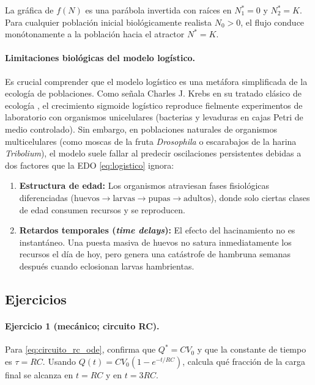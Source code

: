 La gráfica de $f(N)$ es una parábola invertida con raíces en $N_1^* = 0$ y $N_2^* = K$. Para cualquier población inicial biológicamente realista $N_0 > 0$, el flujo conduce monótonamente a la población hacia el atractor $N^* = K$.

\paragraph{Limitaciones biológicas del modelo logístico.}
Es crucial comprender que el modelo logístico es una metáfora simplificada de la ecología de poblaciones. Como señala Charles J. Krebs en su tratado clásico de ecología \cite{krebs1972}, el crecimiento sigmoide logístico reproduce fielmente experimentos de laboratorio con organismos unicelulares (bacterias y levaduras en cajas Petri de medio controlado). Sin embargo, en poblaciones naturales de organismos multicelulares (como moscas de la fruta \emph{Drosophila} o escarabajos de la harina \emph{Tribolium}), el modelo suele fallar al predecir oscilaciones persistentes debidas a dos factores que la EDO \eqref{eq:logistico} ignora:
\begin{enumerate}
    \item \textbf{Estructura de edad:} Los organismos atraviesan fases fisiológicas diferenciadas ($\text{huevos} \to \text{larvas} \to \text{pupas} \to \text{adultos}$), donde solo ciertas clases de edad consumen recursos y se reproducen.
    \item \textbf{Retardos temporales (\emph{time delays}):} El efecto del hacinamiento no es instantáneo. Una puesta masiva de huevos no satura inmediatamente los recursos el día de hoy, pero genera una catástrofe de hambruna semanas después cuando eclosionan larvas hambrientas.
\end{enumerate}

\subsection{Ejercicios}

\paragraph{Ejercicio 1 (mecánico; circuito RC).} Para \eqref{eq:circuito_rc_ode}, confirma que $Q^*=CV_0$ y que la constante de tiempo es $\tau=RC$. Usando $Q(t)=CV_0(1-e^{-t/RC})$, calcula qué fracción de la carga final se alcanza en $t=RC$ y en $t=3RC$.

